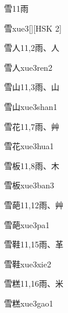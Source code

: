 \begin{entry}{雪}{11}{⾬}
  \begin{phonetics}{雪}{xue3}[][HSK 2]
  \end{phonetics}
\end{entry}

\begin{entry}{雪人}{11,2}{⾬、⼈}
  \begin{phonetics}{雪人}{xue3ren2}
  \end{phonetics}
\end{entry}

\begin{entry}{雪山}{11,3}{⾬、⼭}
  \begin{phonetics}{雪山}{xue3shan1}
  \end{phonetics}
\end{entry}

\begin{entry}{雪花}{11,7}{⾬、⾋}
  \begin{phonetics}{雪花}{xue3hua1}
  \end{phonetics}
\end{entry}

\begin{entry}{雪板}{11,8}{⾬、⽊}
  \begin{phonetics}{雪板}{xue3ban3}
  \end{phonetics}
\end{entry}

\begin{entry}{雪葩}{11,12}{⾬、⾋}
  \begin{phonetics}{雪葩}{xue3pa1}
  \end{phonetics}
\end{entry}

\begin{entry}{雪鞋}{11,15}{⾬、⾰}
  \begin{phonetics}{雪鞋}{xue3xie2}
  \end{phonetics}
\end{entry}

\begin{entry}{雪糕}{11,16}{⾬、⽶}
  \begin{phonetics}{雪糕}{xue3gao1}
  \end{phonetics}
\end{entry}

